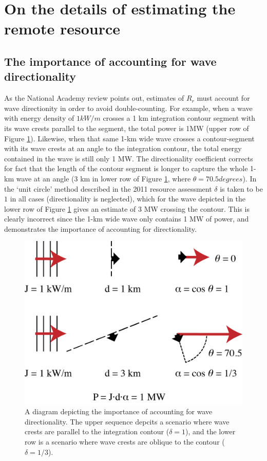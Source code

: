 \section{On the details of estimating the remote resource} \label{appendix:one-way-method}

\subsection{The importance of accounting for wave directionality} \label{appendix:directionality}


As the National Academy review points out, estimates of $R_r$ must account for wave directionity in order to avoid double-counting. For example, when a wave with energy density of $1 \unit{kW/m}$ crosses a 1 km integration contour segment with its wave crests parallel to the segment, the total power is 1MW (upper row of Figure \ref{fig:directionality}). Likewise, when that same 1-km wide wave crosses a contour-segment with its wave crests at an angle to the integration contour, the total energy contained in the wave is still only 1 MW. The directionality coefficient corrects for fact that the length of the contour segment is longer to capture the whole 1-km wave at an angle (3 km in lower row of Figure \ref{fig:directionality}, where $\theta = 70.5 \unit{degrees}$). In the `unit circle' method described in the 2011 resource assessment $\delta$ is taken to be $1$ in all cases (directionality is neglected), which for the wave depicted in the lower row of Figure \ref{fig:directionality} gives an estimate of 3 MW crossing the contour. This is clearly incorrect since the 1-km wide wave only contains 1 MW of power, and demonstrates the importance of accounting for directionality.

\begin{figure}[ht]
    \centering
    \includegraphics[width=0.6 \linewidth]{../diagram/Dot-Product_Schematic01.png}
    \caption{A diagram depicting the importance of accounting for wave directionality. The upper sequence depcits a scenario where wave crests are parallel to the integration contour ($\delta = 1$), and the lower row is a scenario where wave crests are oblique to the contour ($\delta = 1/3$). }
    \label{fig:directionality}
\end{figure}

